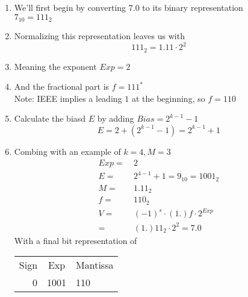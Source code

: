 \documentclass{article}
\begin{document}
\begin{enumerate}[label=\Alph*)]
    \begin{enumerate}[label=\arabic*.]
        \item We'll first begin by converting 7.0 to its binary representation \\
        \(7_{10} = 111_2\)
        \item Normalizing this representation leaves us with
        \[111_2 = 1.11 \cdot 2^2\]
        \item Meaning the exponent \(Exp = 2\)
        \item And the fractional part is \(f = 111^*\) \\
        Note: IEEE implies a leading \(1\) at the beginning, so \(f = 110\)
        \item Calculate the biasd \(E\) by adding \(Bias = 2^{k-1} - 1\)
        \[E = 2 + (2^{k-1} - 1) = 2^{k-1} + 1\]
        \item Combing with an example of \(k = 4, M = 3\)
        \begin{align*}
            Exp =&\ 2 \\
            E =&\ 2^{4-1} + 1 = 9_{10} = 1001_2 \\
            M =&\ 1.11_2 \\
            f =&\ 110_2 \\
            V =&\ (-1)^s \cdot (1.)f \cdot 2^{Exp} \\
              =&\ (1.)11_2 \cdot 2^{2} = 7.0
        \end{align*}
        With a final bit representation of
        \begin{tabular}{r|c|l}
            Sign & Exp & Mantissa \\
            0 & 1001 & 110 \\
        \end{tabular}
    \end{enumerate}

    \pagebreak


\end{enumerate}
\end{document}
